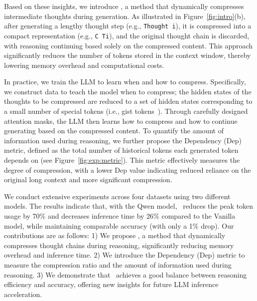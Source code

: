 Based on these insights, we introduce \ours, a method that dynamically compresses intermediate thoughts during generation. 
As illustrated in Figure~\ref{fig:intro}(b), after generating a lengthy thought step (e.g., \texttt{Thought i}), it is compressed into a compact representation (e.g., \texttt{C Ti}), and the original thought chain is discarded, with reasoning continuing based solely on the compressed content. 
This approach significantly reduces the number of tokens stored in the context window, thereby lowering memory overhead and computational costs.

In practice, we train the LLM to learn when and how to compress. 
Specifically, we construct data to teach the model when to compress; the hidden states of the thoughts to be compressed are reduced to a set of hidden states corresponding to a small number of special tokens (i.e., gist tokens~\citep{nips23_gist}).
Through carefully designed attention masks, the LLM then learns how to compress and how to continue generating based on the compressed content.
{To quantify the amount of information used during reasoning, we further propose the Dependency (Dep) metric, defined as the total number of historical tokens each generated token depends on (see Figure~\ref{fig:exp:metric}). 
This metric effectively measures the degree of compression, with a lower Dep value indicating reduced reliance on the original long context and more significant compression.}

We conduct extensive experiments across four datasets using two different models. 
The results indicate that, with the Qwen model, \ours~reduces the peak token usage by 70\% and decreases inference time by 26\% compared to the Vanilla model, while maintaining comparable accuracy (with only a 1\% drop).
Our contributions are as follows:
1) We propose \ours, a method that dynamically compresses thought chains during reasoning, significantly reducing memory overhead and inference time.
2) We introduce the Dependency (Dep) metric to measure the compression ratio and the amount of information used during reasoning.
3) We demonstrate that \ours~achieves a good balance between reasoning efficiency and accuracy, offering new insights for future LLM inference acceleration.